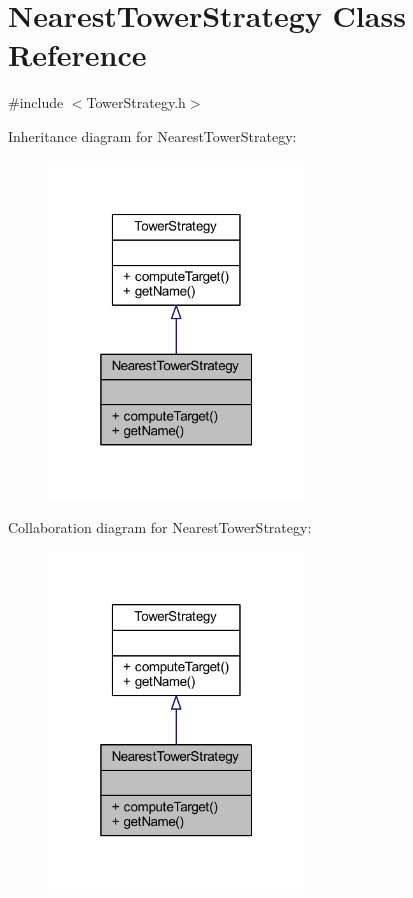 \hypertarget{class_nearest_tower_strategy}{\section{Nearest\+Tower\+Strategy Class Reference}
\label{class_nearest_tower_strategy}
}


{\ttfamily \#include $<$Tower\+Strategy.\+h$>$}



Inheritance diagram for Nearest\+Tower\+Strategy\+:\nopagebreak
\begin{figure}[H]
\begin{center}
\leavevmode
\includegraphics[width=193pt]{class_nearest_tower_strategy__inherit__graph}
\end{center}
\end{figure}


Collaboration diagram for Nearest\+Tower\+Strategy\+:\nopagebreak
\begin{figure}[H]
\begin{center}
\leavevmode
\includegraphics[width=193pt]{class_nearest_tower_strategy__coll__graph}
\end{center}
\end{figure}
